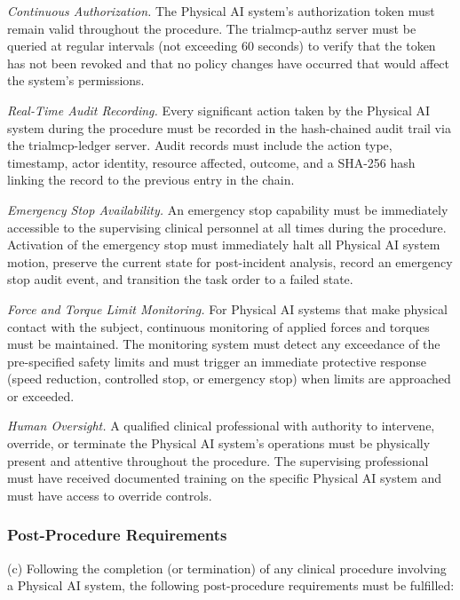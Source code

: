 \documentclass[11pt]{article}
\begin{document}
\begin{description}[leftmargin=1.0cm,style=sameline]
\item[(1)] \textit{Continuous Authorization.} The Physical AI system's authorization token must remain valid throughout the procedure. The trialmcp-authz server must be queried at regular intervals (not exceeding 60 seconds) to verify that the token has not been revoked and that no policy changes have occurred that would affect the system's permissions.
\item[(2)] \textit{Real-Time Audit Recording.} Every significant action taken by the Physical AI system during the procedure must be recorded in the hash-chained audit trail via the trialmcp-ledger server. Audit records must include the action type, timestamp, actor identity, resource affected, outcome, and a SHA-256 hash linking the record to the previous entry in the chain.
\item[(3)] \textit{Emergency Stop Availability.} An emergency stop capability must be immediately accessible to the supervising clinical personnel at all times during the procedure. Activation of the emergency stop must immediately halt all Physical AI system motion, preserve the current state for post-incident analysis, record an emergency stop audit event, and transition the task order to a failed state.
\item[(4)] \textit{Force and Torque Limit Monitoring.} For Physical AI systems that make physical contact with the subject, continuous monitoring of applied forces and torques must be maintained. The monitoring system must detect any exceedance of the pre-specified safety limits and must trigger an immediate protective response (speed reduction, controlled stop, or emergency stop) when limits are approached or exceeded.
\item[(5)] \textit{Human Oversight.} A qualified clinical professional with authority to intervene, override, or terminate the Physical AI system's operations must be physically present and attentive throughout the procedure. The supervising professional must have received documented training on the specific Physical AI system and must have access to override controls.
\end{description}

\subsubsection{Post-Procedure Requirements}

(c) Following the completion (or termination) of any clinical procedure involving a Physical AI system, the following post-procedure requirements must be fulfilled:
\end{document}
